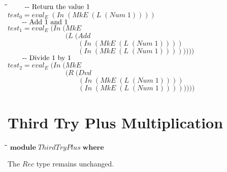 \documentclass[10pt]{article}
\newlength{\lwidth}\setlength{\lwidth}{4.5cm}
\newlength{\cwidth}\setlength{\cwidth}{8mm} %
\newcommand{\Conid}[1]{\mathit{#1}}
\newcommand{\Varid}[1]{\mathit{#1}}
\begin{document}
\begin{tabbing}
\qquad\=\hspace{\lwidth}\=\hspace{\cwidth}\=\+\kill
${\mbox{\qquad-{}-  Return the value 1}}$\\
${\Varid{test}_0\mathrel{=}\Varid{eval}_E\;(\Conid{In}\;(\Conid{MkE}\;(\Conid{L}\;(\Conid{Num}\;\mathrm{1}))))}$\\
${}$\\
${\mbox{\qquad-{}-  Add 1 and 1}}$\\
${\Varid{test}_1\mathrel{=}\Varid{eval}_E\;(\Conid{In}\;(\Conid{MkE}}$\\
${\phantom{\Varid{test}_1\mathrel{=}\Varid{eval}_E\;(\Conid{In}\;(\mbox{}}(\Conid{L}\;(\Conid{Add}}$\\
${\phantom{\Varid{test}_1\mathrel{=}\Varid{eval}_E\;(\Conid{In}\;(\mbox{}}\phantom{(\Conid{L}\;(\mbox{}}(\Conid{In}\;(\Conid{MkE}\;(\Conid{L}\;(\Conid{Num}\;\mathrm{1}))))}$\\
${\phantom{\Varid{test}_1\mathrel{=}\Varid{eval}_E\;(\Conid{In}\;(\mbox{}}\phantom{(\Conid{L}\;(\mbox{}}(\Conid{In}\;(\Conid{MkE}\;(\Conid{L}\;(\Conid{Num}\;\mathrm{1}))))))))}$\\
${}$\\
${\mbox{\qquad-{}-  Divide 1 by 1}}$\\
${\Varid{test}_2\mathrel{=}\Varid{eval}_E\;(\Conid{In}\;(\Conid{MkE}}$\\
${\phantom{\Varid{test}_2\mathrel{=}\Varid{eval}_E\;(\Conid{In}\;(\mbox{}}(\Conid{R}\;(\Conid{Dvd}}$\\
${\phantom{\Varid{test}_2\mathrel{=}\Varid{eval}_E\;(\Conid{In}\;(\mbox{}}\phantom{(\Conid{R}\;(\mbox{}}(\Conid{In}\;(\Conid{MkE}\;(\Conid{L}\;(\Conid{Num}\;\mathrm{1}))))}$\\
${\phantom{\Varid{test}_2\mathrel{=}\Varid{eval}_E\;(\Conid{In}\;(\mbox{}}\phantom{(\Conid{R}\;(\mbox{}}(\Conid{In}\;(\Conid{MkE}\;(\Conid{L}\;(\Conid{Num}\;\mathrm{1}))))))))}$
\end{tabbing}
\section{Third Try Plus Multiplication}

\begin{tabbing}
\qquad\=\hspace{\lwidth}\=\hspace{\cwidth}\=\+\kill
${\mathbf{module}\;\Conid{ThirdTryPlus}\;\mathbf{where}}$
\end{tabbing}
The \ensuremath{\Conid{Rec}} type remains unchanged.
\end{document}
